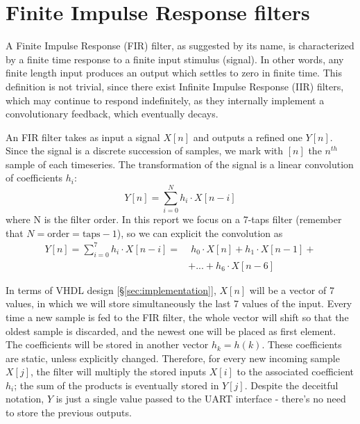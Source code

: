 \section{Finite Impulse Response filters}
\label{sec:firs}

A Finite Impulse Response (FIR) filter, as suggested by its name, is characterized by a finite time response to a finite input stimulus (signal). In other words, any finite length input produces an output which settles to zero in finite time. This definition is not trivial, since there exist Infinite Impulse Response (IIR) filters, which may continue to respond indefinitely, as they internally implement a convolutionary feedback, which eventually decays. \cite{wiki_fir}

An FIR filter takes as input a signal $X[n]$ and outputs a refined one $Y[n]$. Since the signal is a discrete succession of samples, we mark with $[n]$ the $n^{th}$ sample of each timeseries. The transformation of the signal is a linear convolution of coefficients $h_i$: 
\[Y[n]=\sum_{i=0}^{N}h_i \cdot X[n-i]\]
where N is the filter order. In this report we focus on a 7-taps filter (remember that $N = \textrm{order} = \textrm{taps} - 1$), so we can explicit the convolution as
\begin{equation}
\begin{split}  %
    Y[n] = \sum_{i=0}^{7}h_i \cdot X[n-i] = & \; h_0 \cdot X[n] + h_1 \cdot X[n-1] +\\
           & + ... + h_6 \cdot X[n-6] 
\end{split}
\label{eq:7fir}
\end{equation}

In terms of VHDL design [§\ref{sec:implementation}], $X[n]$ will be a vector of 7 values, in which we will store simultaneously the last 7 values of the input. Every time a new sample is fed to the FIR filter, the whole vector will shift so that the oldest sample is discarded, and the newest one will be placed as first element. The coefficients will be stored in another vector $h_k = h(k)$. These coefficients are static, unless explicitly changed. Therefore, for every new incoming sample $X[j]$, the filter will multiply the stored inputs $X[i]$ to the associated coefficient $h_i$; the sum of the products is eventually stored in $Y[j]$. Despite the deceitful notation, $Y$ is just a single value passed to the UART interface - there's no need to store the previous outputs.






